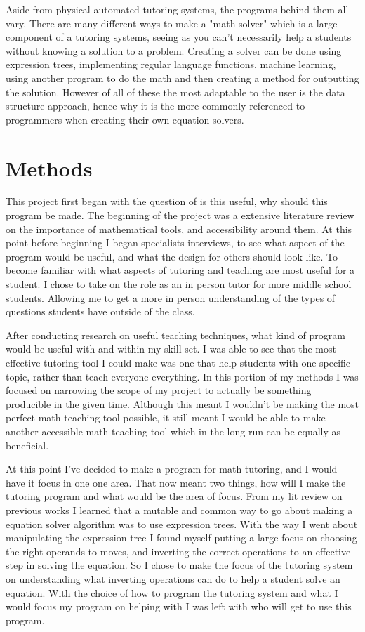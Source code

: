 \documentclass[10pt,twocolumn]{article}
\begin{document}
Aside from physical automated tutoring systems, the programs behind them all vary. There are many different ways to make a "math solver" which is a large component of a tutoring systems, seeing as you can't necessarily help a students without knowing a solution to a problem. Creating a solver can be done using expression trees, implementing regular language functions, machine learning, using another program to do the math and then creating a method for outputting the solution. However of all of these the most adaptable to the user is the data structure approach, hence why it is the more commonly referenced to programmers when creating their own equation solvers. 

\section{Methods}
This project first began with the question of is this useful, why should this program be made. The beginning of the project was a extensive literature review on the importance of mathematical tools, and accessibility around them. At this point before beginning I began specialists interviews, to see what aspect of the program would be useful, and what the design for others should look like. To become familiar with what aspects of tutoring and teaching are most useful for a student. I chose to take on the role as an in person tutor for more middle school students. Allowing me to get a more in person understanding of the types of questions students have outside of the class. 

After conducting research on useful teaching techniques, what kind of program would be useful with and within my skill set. I was able to see that the most effective tutoring tool I could make was one that help students with one specific topic, rather than teach everyone everything. In this portion of my methods I was focused on narrowing the scope of my project to actually be something producible in the given time. Although this meant I wouldn't be making the most perfect math teaching tool possible, it still meant I would be able to make another accessible math teaching tool which in the long run can be equally as beneficial.

At this point I've decided to make a program for math tutoring, and I would have it focus in one one area. That now meant two things, how will I make the tutoring program and what would be the area of focus. From my lit review on previous works I learned that a mutable and common way to go about making a equation solver algorithm was to use expression trees. With the way I went about manipulating the expression tree I found myself putting a large focus on choosing the right operands to moves, and inverting the correct operations to an effective step in solving the equation. So I chose to make the focus of the tutoring system on understanding what inverting operations can do to help a student solve an equation. With the choice of how to program the tutoring system and what I would focus my program on helping with I was left with who will get to use this program.
\end{document}
